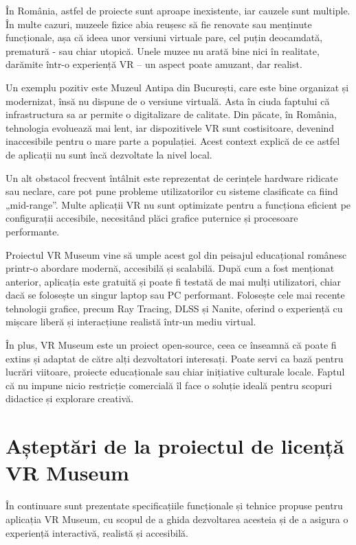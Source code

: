 În România, astfel de proiecte sunt aproape inexistente, iar cauzele sunt multiple. În multe cazuri, muzeele fizice abia reușesc să fie renovate sau menținute funcționale, așa că ideea unor versiuni virtuale pare, cel puțin deocamdată, prematură - sau chiar utopică. Unele muzee nu arată bine nici în realitate, darămite într-o experiență VR – un aspect poate amuzant, dar realist.

Un exemplu pozitiv este Muzeul Antipa din București, care este bine organizat și modernizat, însă nu dispune de o versiune virtuală. Asta în ciuda faptului că infrastructura sa ar permite o digitalizare de calitate. 
Din păcate, în România, tehnologia evoluează mai lent, iar dispozitivele VR sunt costisitoare, devenind inaccesibile pentru o mare parte a populației. Acest context explică de ce astfel de aplicații nu sunt încă dezvoltate la nivel local.

Un alt obstacol frecvent întâlnit este reprezentat de cerințele hardware ridicate sau neclare, care pot pune probleme utilizatorilor cu sisteme clasificate ca fiind „mid-range”. Multe aplicații VR nu sunt optimizate pentru a funcționa eficient pe configurații accesibile, necesitând plăci grafice puternice și procesoare performante.

Proiectul VR Museum vine să umple acest gol din peisajul educațional românesc printr-o abordare modernă, accesibilă și scalabilă. După cum a fost menționat anterior, aplicația este gratuită și poate fi testată de mai mulți utilizatori, chiar dacă se folosește un singur laptop sau PC performant. Folosește cele mai recente tehnologii grafice, precum Ray Tracing, DLSS și Nanite, oferind o experiență cu mișcare liberă și interacțiune realistă într-un mediu virtual.

În plus, VR Museum este un proiect open-source, ceea ce înseamnă că poate fi extins și adaptat de către alți dezvoltatori interesați. Poate servi ca bază pentru lucrări viitoare, proiecte educaționale sau chiar inițiative culturale locale. Faptul că nu impune nicio restricție comercială îl face o soluție ideală pentru scopuri didactice și explorare creativă.

\section{Așteptări de la proiectul de licență VR Museum}

În continuare sunt prezentate specificațiile funcționale și tehnice propuse pentru aplicația VR Museum, cu scopul de a ghida dezvoltarea acesteia și de a asigura o experiență interactivă, realistă și accesibilă.

